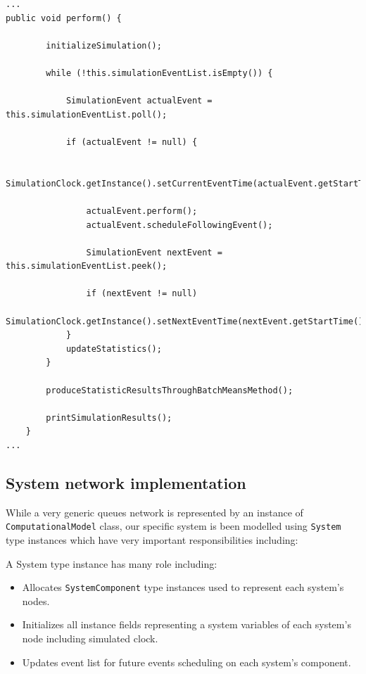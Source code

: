 \documentclass[10pt,a4paper]{article}
\begin{document}
\begin{lstlisting}[frame=lines, caption={Snippet of \texttt{perform} method}, label={code:perform}]
...
public void perform() {

        initializeSimulation();

        while (!this.simulationEventList.isEmpty()) {

            SimulationEvent actualEvent = this.simulationEventList.poll();

            if (actualEvent != null) {

                SimulationClock.getInstance().setCurrentEventTime(actualEvent.getStartTime());

                actualEvent.perform();
                actualEvent.scheduleFollowingEvent();

                SimulationEvent nextEvent = this.simulationEventList.peek();

                if (nextEvent != null)
                    SimulationClock.getInstance().setNextEventTime(nextEvent.getStartTime());
            }
            updateStatistics();
        }

        produceStatisticResultsThroughBatchMeansMethod();

        printSimulationResults();
    }
...
\end{lstlisting}


\subsection{System network implementation}

While a very generic queues network is represented by an instance of \texttt{ComputationalModel} class, our specific system is been modelled using \texttt{System} type instances which have very important responsibilities including:

A System type instance has many role including:

\begin{itemize}

\item Allocates \texttt{SystemComponent} type instances used to represent each system's nodes.

\item Initializes all instance fields representing a system variables of each system's node including simulated clock.

\item Updates event list for future events scheduling on each system's component. 

\end{itemize}
\end{document}
